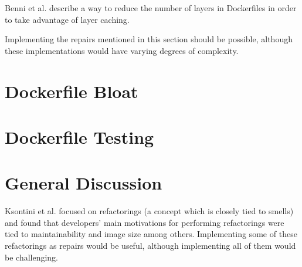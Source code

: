 Benni et al. \cite{benniSupportingMicroservicesDeployment2018} describe a way to reduce the number of layers in Dockerfiles in order to take advantage of layer caching.

Implementing the repairs mentioned in this section should be possible, although these implementations would have varying degrees of complexity.

\section{Dockerfile Bloat} \label{sec:dockerfile_bloat}
\section{Dockerfile Testing} \label{sec:dockerfile_testing}
\section{General Discussion} \label{sec:general_discussion}

Ksontini et al. \cite{ksontiniRefactoringsTechnicalDebt} focused on refactorings (a concept which is closely tied to smells) and found that developers' main motivations for performing refactorings were tied to maintainability and image size among others. Implementing some of these refactorings as repairs would be useful, although implementing all of them would be challenging.

